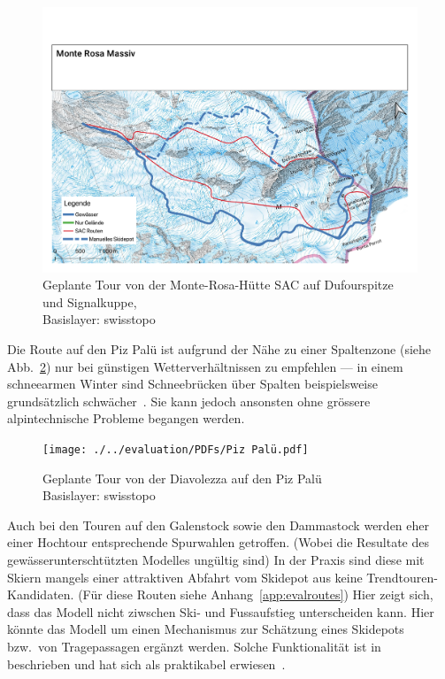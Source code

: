 \begin{figure}[ht]
  \centering
  \includegraphics[page=1,width=.9\linewidth]{./../evaluation/PDFs/Monte Rosa Massiv.pdf}
  \caption{Geplante Tour von der Monte-Rosa-Hütte SAC auf Dufourspitze und Signalkuppe,\\Basislayer: swisstopo}\label{fig:monterosa}
\end{figure}

Die Route auf den Piz Palü ist aufgrund der Nähe zu einer Spaltenzone (siehe Abb.\ \ref{fig:pizpalu}) nur bei günstigen Wetterverhältnissen zu empfehlen --- in einem schneearmen Winter sind Schneebrücken über Spalten beispielsweise grundsätzlich schwächer~\cite{bergsteigenErhhtesRisiko}. Sie kann jedoch ansonsten ohne grössere alpintechnische Probleme begangen werden.

\begin{figure}[ht]
  \centering
  \texttt{[image: ./../evaluation/PDFs/Piz Palü.pdf]}
  \caption{Geplante Tour von der Diavolezza auf den Piz Palü\\Basislayer: swisstopo}\label{fig:pizpalu}
\end{figure}

Auch bei den Touren auf den Galenstock sowie den Dammastock werden eher einer Hochtour entsprechende Spurwahlen getroffen. (Wobei die Resultate des gewässerunterschtützten Modelles ungültig sind) 
In der Praxis sind diese mit Skiern mangels einer attraktiven Abfahrt vom Skidepot aus keine Trendtouren-Kandidaten. (Für diese Routen siehe Anhang\ \ref{app:evalroutes}) Hier zeigt sich, dass das Modell nicht ziwschen Ski- und Fussaufstieg unterscheiden kann. Hier könnte das Modell um einen Mechanismus zur Schätzung eines Skidepots bzw.\ von Tragepassagen ergänzt werden. Solche Funktionalität ist in\ \citeauthor{footandcautionsection} beschrieben und hat sich als praktikabel erwiesen~\cite{footandcautionsection}.

